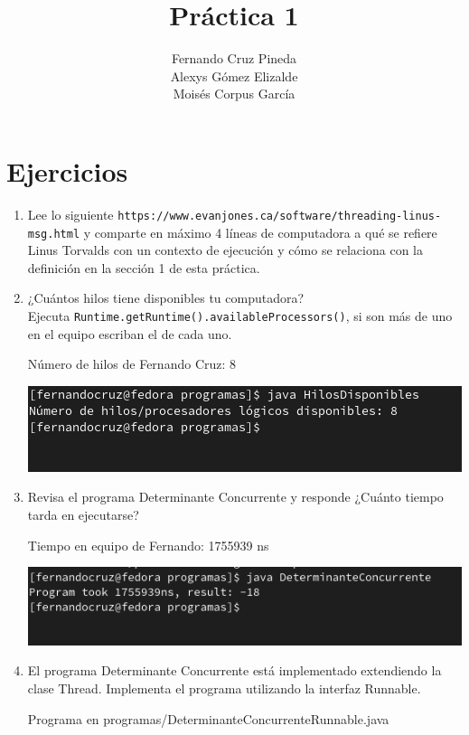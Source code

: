 \documentclass[12pt]{article}
\title{Práctica 1}
\author{Fernando Cruz Pineda \\ Alexys Gómez Elizalde \\ Moisés Corpus García}
\date{}
\begin{document}
\maketitle

\section*{Ejercicios}

\begin{enumerate}
    \item Lee lo siguiente \texttt{https://www.evanjones.ca/software/threading-linus-msg.html} y comparte en máximo 4 líneas de computadora a qué se refiere Linus Torvalds con un contexto de ejecución y cómo se relaciona con la definición en la sección 1 de esta práctica.
    \item ¿Cuántos hilos tiene disponibles tu computadora? \\
      Ejecuta \texttt{Runtime.getRuntime().availableProcessors()}, si son más de uno en el equipo escriban el de cada uno.

      Número de hilos de Fernando Cruz: 8

      \includegraphics[]{Fer.png}

    \item Revisa el programa Determinante Concurrente y responde ¿Cuánto tiempo tarda en ejecutarse?

      Tiempo en equipo de Fernando: 1755939 ns

      \includegraphics[]{Fer2.png}

      
    \item El programa Determinante Concurrente está implementado extendiendo la clase Thread. Implementa el programa utilizando la interfaz Runnable.

      Programa en programas/DeterminanteConcurrenteRunnable.java
      

\end{enumerate}
\end{document}
